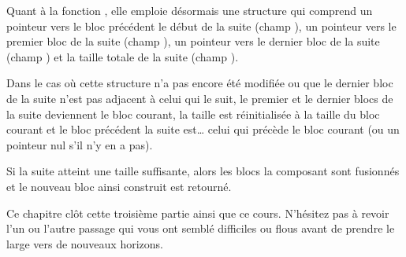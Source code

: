 Quant à la fonction , elle emploie
désormais une structure  qui comprend un pointeur vers le
bloc précédent le début de la suite (champ ), un
pointeur vers le premier bloc de la suite (champ ), un
pointeur vers le dernier bloc de la suite (champ ) et la
taille totale de la suite (champ ).

Dans le cas où cette structure n'a pas encore été modifiée ou que le
dernier bloc de la suite n'est pas adjacent à celui qui le suit, le
premier et le dernier blocs de la suite deviennent le bloc courant, la
taille est réinitialisée à la taille du bloc courant et le bloc
précédent la suite est\ldots{} celui qui précède le bloc courant (ou un
pointeur nul s'il n'y en a pas).

Si la suite atteint une taille suffisante, alors les blocs la composant
sont fusionnés et le nouveau bloc ainsi construit est
retourné.

\hrulefill

Ce chapitre clôt cette troisième partie ainsi que ce cours. N'hésitez pas à 
revoir l'un ou l'autre passage qui vous ont semblé difficiles ou flous avant
de prendre le large vers de nouveaux horizons.
